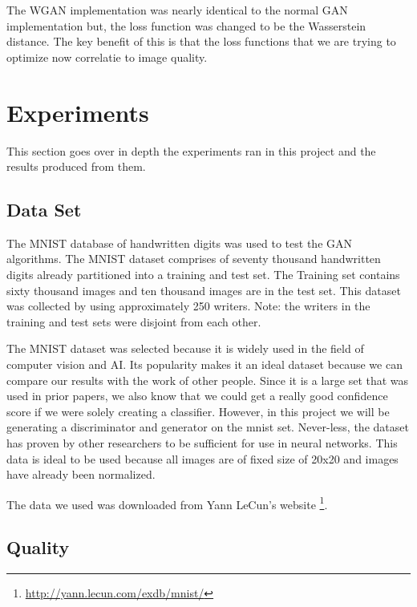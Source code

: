 \documentclass[12pt,
 reprint,
 amsmath,amssymb,
 aps,
]{revtex4-2}
\begin{document}
The WGAN implementation was nearly identical to the normal GAN implementation but, the loss function was changed to be the Wasserstein distance. The key benefit of this is that the loss functions that we are trying to optimize now correlatie to image quality. 



\section{\label{sec:exp}Experiments}

This section goes over in depth the experiments ran in this project and the results produced from them.


\subsection{\label{sec:dataSet}Data Set}

The MNIST database of handwritten digits was used to test the GAN algorithms. The MNIST dataset comprises of seventy thousand handwritten digits already partitioned into a training and test set. The Training set contains sixty thousand images and ten thousand images are in the test set. This dataset was collected by using approximately 250 writers. Note: the writers in the training and test sets were disjoint from each other.

The MNIST dataset was selected because it is widely used in the field of computer vision and AI. Its popularity makes it an ideal dataset because we can compare our results with the work of other people. Since it is a large set that was used in prior papers, we also know that we could get a really good confidence score if we were solely creating a classifier. However, in this project we will be generating a discriminator and generator on the mnist set. Never-less, the dataset has proven by other researchers to be sufficient for use in neural networks. This  data is ideal to be used because all images are of fixed size of 20x20 and images have already been normalized. 

The data we used was downloaded from Yann LeCun's website \footnote{\url{http://yann.lecun.com/exdb/mnist/}}.


\subsection{\label{sec:expQuality}Quality}
\end{document}
